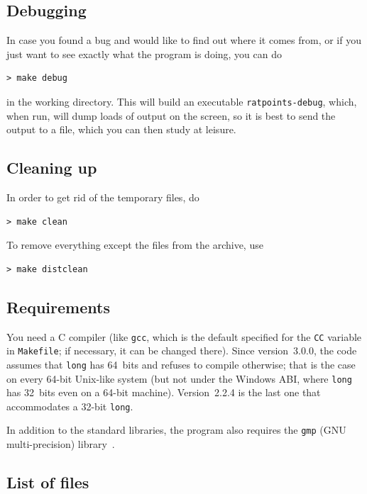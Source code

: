 \documentclass[12pt,a4paper,oneside]{amsart}
\begin{document}
\subsection{Debugging}

In case you found a bug and would like to find out where it comes from,
or if you just want to see exactly what the program is doing, you can
do

\begin{verbatim}
> make debug
\end{verbatim}

in the working directory. This will build an executable \texttt{ratpoints-debug},
which, when run, will dump loads of output on the screen, so it is best
to send the output to a file, which you can then study at leisure.

\subsection{Cleaning up}

In order to get rid of the temporary files, do

\begin{verbatim}
> make clean
\end{verbatim}

To remove everything except the files from the archive, use

\begin{verbatim}
> make distclean
\end{verbatim}

\subsection{Requirements}

You need a C compiler (like \texttt{gcc}, which is the default specified
for the \texttt{CC} variable in \texttt{Makefile}; if necessary, it can be
changed there). Since version~3.0.0, the code assumes that \texttt{long} has
64~bits and refuses to compile otherwise; that is the case on every 64-bit
Unix-like system (but not under the Windows ABI, where \texttt{long} has
32~bits even on a 64-bit machine). Version~2.2.4 is the last one that
accommodates a 32-bit \texttt{long}.

In addition to the standard libraries, the program also requires the
\texttt{gmp} (GNU multi-precision) library~\cite{gmp}.

\subsection{List of files}
\end{document}
